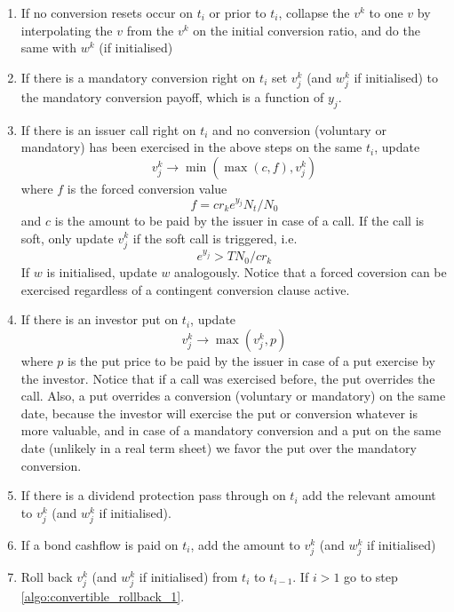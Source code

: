 {\begin{enumerate}
  \begin{enumerate}
  \item  for all $k=1,\ldots,K$, $j=1,\ldots,n$:
  \item interpolate $v_j^k$ linearly from the $v_j^\kappa$ on the adjusted conversion ratio $cr'=cr'(cr_k, y_j)$ which
    is always computable as a function of the assumed conversion ratio for $v^k$ and the log equity price $y_j$ for the
    involved reset and dividend protection features.
  \item interpolate $w_j^k$ from $w_j^\kappa$ analoguously, if $w$ is initialised
  \end{enumerate}
\item If no conversion resets occur on $t_i$ or prior to $t_i$, collapse the $v^k$ to one $v$ by interpolating the $v$
  from the $v^k$ on the initial conversion ratio, and do the same with $w^k$ (if initialised)
\item If there is a mandatory conversion right on $t_i$ set $v^k_j$ (and $w^k_j$ if initialised) to the mandatory
  conversion payoff, which is a function of $y_j$.
\item If there is an issuer call right on $t_i$ and no conversion (voluntary or mandatory) has been exercised in the
  above steps on the same $t_i$, update
  $$v_j^k \rightarrow \min(\max(c, f), v_j^k)$$
  where $f$ is the forced conversion value
  $$f = cr_k e^{y_j} N_t/N_0$$
  and $c$ is the amount to be paid by the issuer in case of a call. If the call is soft, only update
  $v_j^k$ if the soft call is triggered, i.e.
  $$e^{y_j} > T N_0 / cr_k$$
  If $w$ is initialised, update $w$ analogously. Notice that a forced coversion can be exercised regardless of a
  contingent conversion clause active.
\item If there is an investor put on $t_i$, update
  $$v_j^k \rightarrow \max( v_j^k, p)$$ where $p$ is the put price to be paid by the issuer in case of a put exercise by
  the investor. Notice that if a call was exercised before, the put overrides the call. Also, a put overrides a
  conversion (voluntary or mandatory) on the same date, because the investor will exercise the put or conversion
  whatever is more valuable, and in case of a mandatory conversion and a put on the same date (unlikely in a real term
  sheet) we favor the put over the mandatory conversion.
\item If there is a dividend protection pass through on $t_i$ add the relevant amount to $v_j^k$ (and $w_j^k$ if
  initialised).
\item If a bond cashflow is paid on $t_i$, add the amount to $v_j^k$ (and $w_j^k$ if initialised)
\item Roll back $v_j^k$ (and $w_j^k$ if initialised) from $t_i$ to $t_{i-1}$. If $i>1$ go to step
  \ref{algo:convertible_rollback_1}.
\end{enumerate}

}

